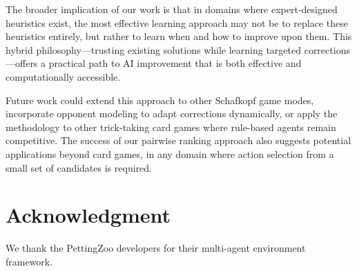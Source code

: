 \documentclass[conference]{IEEEtran}
\begin{document}
The broader implication of our work is that in domains where expert-designed heuristics exist, the most effective learning approach may not be to replace these heuristics entirely, but rather to learn when and how to improve upon them. This hybrid philosophy—trusting existing solutions while learning targeted corrections—offers a practical path to AI improvement that is both effective and computationally accessible.

Future work could extend this approach to other Schafkopf game modes, incorporate opponent modeling to adapt corrections dynamically, or apply the methodology to other trick-taking card games where rule-based agents remain competitive. The success of our pairwise ranking approach also suggests potential applications beyond card games, in any domain where action selection from a small set of candidates is required.

\section*{Acknowledgment}

We thank the PettingZoo developers for their multi-agent environment framework.
\end{document}
